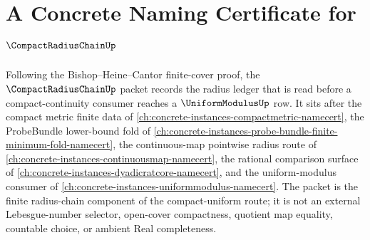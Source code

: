 \chapter{A Concrete Naming Certificate for $\CompactRadiusChainUp$}
\label{ch:concrete-instances-compact-radius-chain-namecert}

Following the Bishop--Heine--Cantor finite-cover proof, the $\CompactRadiusChainUp$ packet records the radius ledger that is read before a compact-continuity consumer reaches a $\UniformModulusUp$ row. It sits after the compact metric finite data of \autoref{ch:concrete-instances-compactmetric-namecert}, the ProbeBundle lower-bound fold of \autoref{ch:concrete-instances-probe-bundle-finite-minimum-fold-namecert}, the continuous-map pointwise radius route of \autoref{ch:concrete-instances-continuousmap-namecert}, the rational comparison surface of \autoref{ch:concrete-instances-dyadicratcore-namecert}, and the uniform-modulus consumer of \autoref{ch:concrete-instances-uniformmodulus-namecert}. The packet is the finite radius-chain component of the compact-uniform route; it is not an external Lebesgue-number selector, open-cover compactness, quotient map equality, countable choice, or ambient Real completeness.

